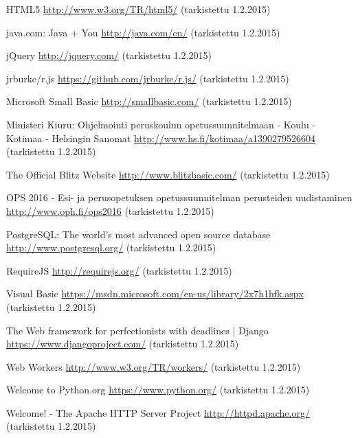 \begin{thebibliography}{99}
	HTML5 \url{http://www.w3.org/TR/html5/} (tarkistettu 1.2.2015)
	
	java.com: Java + You \url{http://java.com/en/} (tarkistettu 1.2.2015)
	
	jQuery \url{http://jquery.com/} (tarkistettu 1.2.2015)
	
	jrburke/r.js \url{https://github.com/jrburke/r.js/} (tarkistettu 1.2.2015)
	
	Microsoft Small Basic \url{http://smallbasic.com/} (tarkistettu 1.2.2015)
	
	Ministeri Kiuru: Ohjelmointi peruskoulun opetussuunnitelmaan - Koulu - Kotimaa - Helsingin Sanomat \url{http://www.hs.fi/kotimaa/a1390279526604} (tarkistettu 1.2.2015)
	
	The Official Blitz Website \url{http://www.blitzbasic.com/} (tarkistettu 1.2.2015)
	
	OPS 2016 - Esi- ja perusopetuksen opetussuunnitelman perusteiden uudistaminen \url{http://www.oph.fi/ops2016} (tarkistettu 1.2.2015)
	
	PostgreSQL: The world's most advanced open source database \url{http://www.postgresql.org/} (tarkistettu 1.2.2015)

	RequireJS \url{http://requirejs.org/} (tarkistettu 1.2.2015)

	Visual Basic \url{https://msdn.microsoft.com/en-us/library/2x7h1hfk.aspx} (tarkistettu 1.2.2015)

	The Web framework for perfectionists with deadlines | Django \url{https://www.djangoproject.com/} (tarkistettu 1.2.2015)
	
	Web Workers \url{http://www.w3.org/TR/workers/} (tarkistettu 1.2.2015)

	Welcome to Python.org \url{https://www.python.org/} (tarkistettu 1.2.2015)
	
	Welcome! - The Apache HTTP Server Project \url{http://httpd.apache.org/} (tarkistettu 1.2.2015)

\end{thebibliography}
